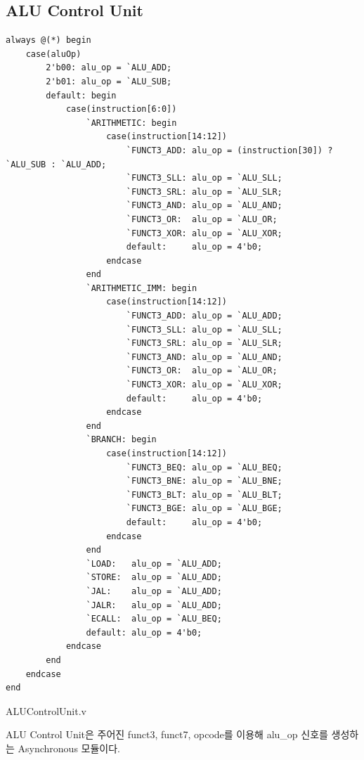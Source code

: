 \documentclass[openright, a4paper]{article}
\newenvironment{longlisting}{\captionsetup{type=listing}}{}
\begin{document}
\subsection{ALU Control Unit}

\begin{longlisting}
    \begin{verbatim}
always @(*) begin
    case(aluOp)
        2'b00: alu_op = `ALU_ADD;
        2'b01: alu_op = `ALU_SUB;
        default: begin
            case(instruction[6:0])
                `ARITHMETIC: begin
                    case(instruction[14:12])
                        `FUNCT3_ADD: alu_op = (instruction[30]) ? `ALU_SUB : `ALU_ADD;
                        `FUNCT3_SLL: alu_op = `ALU_SLL;
                        `FUNCT3_SRL: alu_op = `ALU_SLR;
                        `FUNCT3_AND: alu_op = `ALU_AND;
                        `FUNCT3_OR:  alu_op = `ALU_OR;
                        `FUNCT3_XOR: alu_op = `ALU_XOR;
                        default:     alu_op = 4'b0;
                    endcase
                end
                `ARITHMETIC_IMM: begin
                    case(instruction[14:12])
                        `FUNCT3_ADD: alu_op = `ALU_ADD;
                        `FUNCT3_SLL: alu_op = `ALU_SLL;
                        `FUNCT3_SRL: alu_op = `ALU_SLR;
                        `FUNCT3_AND: alu_op = `ALU_AND;
                        `FUNCT3_OR:  alu_op = `ALU_OR;
                        `FUNCT3_XOR: alu_op = `ALU_XOR;
                        default:     alu_op = 4'b0;
                    endcase
                end
                `BRANCH: begin
                    case(instruction[14:12])
                        `FUNCT3_BEQ: alu_op = `ALU_BEQ;
                        `FUNCT3_BNE: alu_op = `ALU_BNE;
                        `FUNCT3_BLT: alu_op = `ALU_BLT;
                        `FUNCT3_BGE: alu_op = `ALU_BGE;
                        default:     alu_op = 4'b0;
                    endcase
                end
                `LOAD:   alu_op = `ALU_ADD;
                `STORE:  alu_op = `ALU_ADD;
                `JAL:    alu_op = `ALU_ADD;
                `JALR:   alu_op = `ALU_ADD;
                `ECALL:  alu_op = `ALU_BEQ;
                default: alu_op = 4'b0;
            endcase
        end
    endcase
end
    \end{verbatim}
    \caption{ALUControlUnit.v}
\end{longlisting}

ALU Control Unit은 주어진 funct3, funct7, opcode를 이용해 alu_op 신호를 생성하는 Asynchronous 모듈이다. \\
\end{document}
